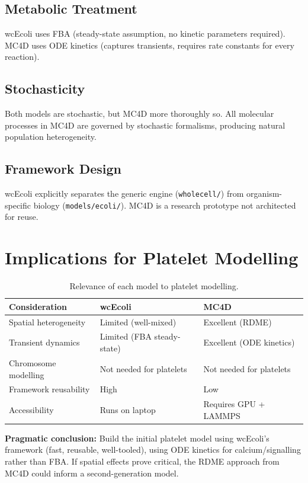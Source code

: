 \documentclass[11pt,a4paper]{report}
\begin{document}
\subsection{Metabolic Treatment}

wcEcoli uses FBA (steady-state assumption, no kinetic parameters required). MC4D uses ODE kinetics (captures transients, requires rate constants for every reaction).

\subsection{Stochasticity}

Both models are stochastic, but MC4D more thoroughly so. All molecular processes in MC4D are governed by stochastic formalisms, producing natural population heterogeneity.

\subsection{Framework Design}

wcEcoli explicitly separates the generic engine (\texttt{wholecell/}) from organism-specific biology (\texttt{models/ecoli/}). MC4D is a research prototype not architected for reuse.

\section{Implications for Platelet Modelling}

\begin{table}[h]
\centering
\begin{tabular}{lll}
\toprule
\textbf{Consideration} & \textbf{wcEcoli} & \textbf{MC4D} \\
\midrule
Spatial heterogeneity & Limited (well-mixed) & Excellent (RDME) \\
Transient dynamics & Limited (FBA steady-state) & Excellent (ODE kinetics) \\
Chromosome modelling & Not needed for platelets & Not needed for platelets \\
Framework reusability & High & Low \\
Accessibility & Runs on laptop & Requires GPU + LAMMPS \\
\bottomrule
\end{tabular}
\caption{Relevance of each model to platelet modelling.}
\end{table}

\textbf{Pragmatic conclusion:} Build the initial platelet model using wcEcoli's framework (fast, reusable, well-tooled), using ODE kinetics for calcium/signalling rather than FBA. If spatial effects prove critical, the RDME approach from MC4D could inform a second-generation model.
\end{document}
